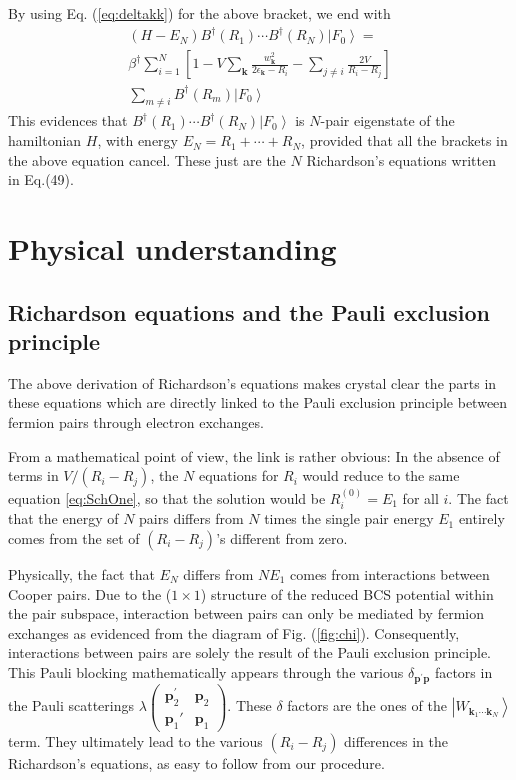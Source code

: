 \documentclass[epj]{svjour}
\newcommand{\vk}{\ensuremath{\mathbf{k}}}
\newcommand{\vp}{\ensuremath{\mathbf{p}}}
\begin{document}
By using  Eq. (\ref{eq:deltakk}) for the above bracket, we end with  
\begin{multline}  
(H-E _N)B^{\dagger}(R_1)\cdots{}B^{\dagger}(R_N)\left|F_0%
\right>  = \\
\beta^\dagger\sum_{i=1}^N\left[1-V\sum_\vk\frac{w_{\mathbf{k} }^2}{2\epsilon_{\mathbf{k}}-R_i}-\sum_{j\neq{}i}\frac{2V%
}{R_i-R_j}\right]\\
\sum_{m\neq{i}}B^{\dagger}(R_m)\left|F_0\right>  
\end{multline}
This evidences that $B^{\dagger}(R_1)\cdots{}B^{\dagger}(R_N)\left|F_0\right> $ is $N$-pair eigenstate of the hamiltonian $H$, with energy $E_N=R_1+\cdots+R_N$, provided that all the brackets in the above equation cancel. These just are the $N$ Richardson's equations written in Eq.(49).
\section{Physical understanding\label{sec:understanding}}

\subsection{Richardson equations and the Pauli exclusion principle}

The above  derivation of Richardson's equations makes crystal clear the parts in these equations which are directly linked
to the Pauli exclusion principle between fermion pairs through electron exchanges. 

From a mathematical point of view, the link is rather obvious: In the
absence of terms in $V/(R_i-R_j)$, the $N$ equations for $R_i$ would reduce to
the same equation \eqref{eq:SchOne}, so that the solution would be $R^{(0)}_i=%
E _1$ for all $i$. The fact that the energy of $N$ pairs differs
from $N$ times the single pair energy $E_1$ entirely comes from the set of $(R_i-R_j)$'s
different from zero.

Physically, the fact that $E _N$ differs from $NE _1$
comes from interactions between Cooper pairs. Due to the ($1\times1$) structure of the reduced BCS
potential within the pair subspace, interaction between pairs can only be mediated by fermion
exchanges as evidenced from the diagram of Fig. (\ref{fig:chi}). 
Consequently, interactions between pairs
are solely the result of the Pauli exclusion principle. This
Pauli blocking mathematically appears through the various $\delta_{\mathbf{p}
^{\prime}\mathbf{p} }$ factors in the Pauli scatterings $\lambda(%
\begin{smallmatrix}\vp^\prime_2&\vp_2\\\vp_1'&\vp_1\end{smallmatrix})  $. These $\delta$ factors are the ones of the $\left|W_{\mathbf{k} _1\cdots\mathbf{k} _N}\right>$ term.  They ultimately lead to the various $(R_i-R_j)$ differences
 in the Richardson's equations, as easy to follow from our procedure.
\end{document}
